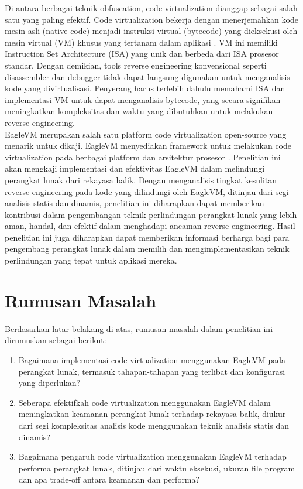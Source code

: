 Di antara berbagai teknik obfuscation, code virtualization dianggap sebagai salah satu yang paling efektif. Code virtualization bekerja dengan menerjemahkan kode mesin asli (native code) menjadi instruksi virtual (bytecode) yang dieksekusi oleh mesin virtual (VM) khusus yang tertanam dalam aplikasi \cite{Ore06}. VM ini memiliki Instruction Set Architecture (ISA) yang unik dan berbeda dari ISA prosesor standar. Dengan demikian, tools reverse engineering konvensional seperti disassembler dan debugger tidak dapat langsung digunakan untuk menganalisis kode yang divirtualisasi. Penyerang harus terlebih dahulu memahami ISA dan implementasi VM untuk dapat menganalisis bytecode, yang secara signifikan meningkatkan kompleksitas dan waktu yang dibutuhkan untuk melakukan reverse engineering. \\

EagleVM merupakan salah satu platform code virtualization open-source yang menarik untuk dikaji. EagleVM menyediakan framework untuk melakukan code virtualization pada berbagai platform dan arsitektur prosesor \cite{Eag21}. Penelitian ini akan mengkaji implementasi dan efektivitas EagleVM dalam melindungi perangkat lunak dari rekayasa balik. Dengan menganalisis tingkat kesulitan reverse engineering pada kode yang dilindungi oleh EagleVM, ditinjau dari segi analisis statis dan dinamis, penelitian ini diharapkan dapat memberikan kontribusi dalam pengembangan teknik perlindungan perangkat lunak yang lebih aman, handal, dan efektif dalam menghadapi ancaman reverse engineering. Hasil penelitian ini juga diharapkan dapat memberikan informasi berharga bagi para pengembang perangkat lunak dalam memilih dan mengimplementasikan teknik perlindungan yang tepat untuk aplikasi mereka.
\section{Rumusan Masalah}
Berdasarkan latar belakang di atas, rumusan masalah dalam penelitian ini dirumuskan sebagai berikut:
\begin{enumerate}
	\item Bagaimana implementasi code virtualization menggunakan EagleVM pada perangkat lunak, termasuk tahapan-tahapan yang terlibat dan konfigurasi yang diperlukan?
	\item Seberapa efektifkah code virtualization menggunakan EagleVM dalam meningkatkan keamanan perangkat lunak terhadap rekayasa balik, diukur dari segi kompleksitas analisis kode menggunakan teknik analisis statis dan dinamis?

	\item Bagaimana pengaruh code virtualization menggunakan EagleVM terhadap performa perangkat lunak, ditinjau dari waktu eksekusi, ukuran file program dan apa trade-off antara keamanan dan performa?

\end{enumerate}

